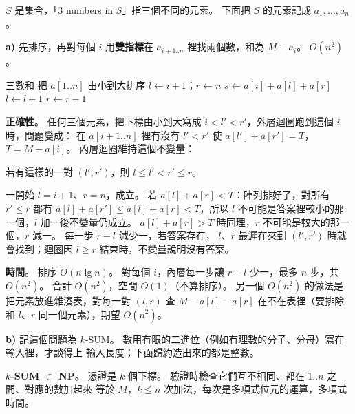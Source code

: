 \begin{pastsoln}
$S$ 是集合，「3 numbers in $S$」指三個不同的元素。 下面把 $S$ 的元素記成 $a_1, \ldots, a_n$。

\textbf{a)} 先排序，再對每個 $i$ 用\textbf{雙指標}在 $a_{i+1..n}$ 裡找兩個數，和為 $M - a_i$。 $O(n^2)$。

\begin{pseudo}{三數和}
    \State 把 $a[1..n]$ 由小到大排序
        \State $l \gets i + 1$；$r \gets n$
            \State $s \gets a[i] + a[l] + a[r]$
                \State \Return \TRUE
                \State $l \gets l + 1$
            \Else
                \State $r \gets r - 1$
            \EndIf
        \EndWhile
    \EndFor
    \State \Return \FALSE
\EndFunction
\end{pseudo}

\textbf{正確性}。 任何三個元素，把下標由小到大寫成 $i < l' < r'$，外層迴圈跑到這個 $i$ 時，問題變成：
在 $a[i+1..n]$ 裡有沒有 $l' < r'$ 使 $a[l'] + a[r'] = T$，$T = M - a[i]$。 內層迴圈維持這個不變量：
\begin{center}
若有這樣的一對 $(l', r')$，則 $l \le l' < r' \le r$。
\end{center}
一開始 $l = i + 1$、$r = n$，成立。 若 $a[l] + a[r] < T$：陣列排好了，對所有 $r' \le r$ 都有
$a[l] + a[r'] \le a[l] + a[r] < T$，所以 $l$ 不可能是答案裡較小的那一個，$l$ 加一後不變量仍成立。
$a[l] + a[r] > T$ 時同理，$r$ 不可能是較大的那一個，$r$ 減一。 每一步 $r - l$ 減少一，若答案存在，
$l$、$r$ 最遲在夾到 $(l', r')$ 時就會找到；迴圈因 $l \ge r$ 結束時，不變量說明沒有答案。

\textbf{時間}。 排序 $O(n \lg n)$。 對每個 $i$，內層每一步讓 $r - l$ 少一，最多 $n$ 步，共 $O(n^2)$。
合計 $O(n^2)$，空間 $O(1)$（不算排序）。 另一個 $O(n^2)$ 的做法是把元素放進雜湊表，對每一對
$(l, r)$ 查 $M - a[l] - a[r]$ 在不在表裡（要排除和 $l$、$r$ 同一個元素），期望 $O(n^2)$。

\textbf{b)} 記這個問題為 $k$-SUM。 數用有限的二進位（例如有理數的分子、分母）寫在輸入裡，才談得上
輸入長度；下面歸約造出來的都是整數。

\textbf{$k$-SUM $\in$ NP}。 憑證是 $k$ 個下標。 驗證時檢查它們互不相同、都在 $1..n$ 之間、對應的數加起來
等於 $M$，$k \le n$ 次加法，每次是多項式位元的運算，多項式時間。


\end{pastsoln}
